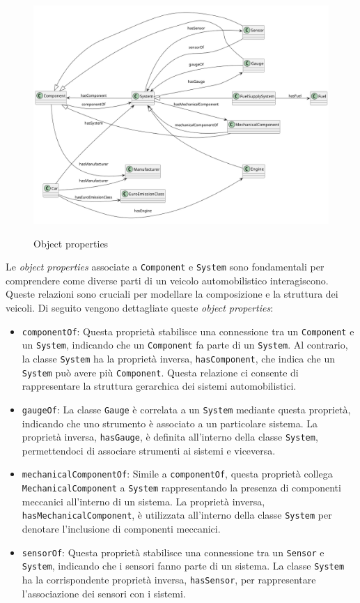 \begin{figure}[H]
    \caption{Object properties}
    \includegraphics[width=\textwidth]{figures/carpedia-object-properties.png}
    \label{fig:carpedia-object-properties}
\end{figure}

Le \textit{object properties} associate a \texttt{Component} e \texttt{System} sono fondamentali per comprendere come diverse parti di un veicolo automobilistico interagiscono. Queste relazioni sono cruciali per modellare la composizione e la struttura dei veicoli. Di seguito vengono dettagliate queste \textit{object properties}:

\begin{itemize}
    \item \texttt{componentOf}: Questa proprietà stabilisce una connessione tra un \texttt{Component} e un \texttt{System}, indicando che un \texttt{Component} fa parte di un \texttt{System}. Al contrario, la classe \texttt{System} ha la proprietà inversa, \texttt{hasComponent}, che indica che un \texttt{System} può avere più \texttt{Component}. Questa relazione ci consente di rappresentare la struttura gerarchica dei sistemi automobilistici.
    \item \texttt{gaugeOf}: La classe \texttt{Gauge} è correlata a un \texttt{System} mediante questa proprietà, indicando che uno strumento è associato a un particolare sistema. La proprietà inversa, \texttt{hasGauge}, è definita all'interno della classe \texttt{System}, permettendoci di associare strumenti ai sistemi e viceversa.
    \item \texttt{mechanicalComponentOf}: Simile a \texttt{componentOf}, questa proprietà collega \texttt{MechanicalComponent} a \texttt{System} rappresentando la presenza di componenti meccanici all'interno di un sistema. La proprietà inversa, \texttt{hasMechanicalComponent}, è utilizzata all'interno della classe \texttt{System} per denotare l'inclusione di componenti meccanici.
    \item \texttt{sensorOf}: Questa proprietà stabilisce una connessione tra un \texttt{Sensor} e \texttt{System}, indicando che i sensori fanno parte di un sistema. La classe \texttt{System} ha la corrispondente proprietà inversa, \texttt{hasSensor}, per rappresentare l'associazione dei sensori con i sistemi.
\end{itemize}

